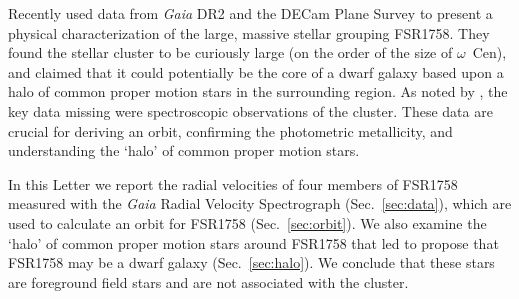 \documentclass[fleqn,usenatbib,letters]{mnras}
\begin{document}
Recently \citet[][hereafter ]{Barba2018} used data from \textit{Gaia} DR2 and the DECam Plane Survey \citep[DECaPS;][]{Schlafly2018} to present a physical characterization of the large, massive stellar grouping FSR1758. They found the stellar cluster to be curiously large (on the order of the size of $\omega$~Cen), and claimed that it could potentially be the core of a dwarf galaxy based upon a halo of common proper motion stars in the surrounding region. As noted by , the key data missing were spectroscopic observations of the cluster. These data are crucial for deriving an orbit, confirming the photometric metallicity, and understanding the `halo' of common proper motion stars.

In this Letter we report the radial velocities of four members of FSR1758 measured with the \textit{Gaia} Radial Velocity Spectrograph \citep[RVS;][]{Cropper2018,GaiaCollaboration:2018fx} (Sec.\ \ref{sec:data}), which are used to calculate an orbit for FSR1758 (Sec.\ \ref{sec:orbit}). We also examine the `halo' of common proper motion stars around FSR1758 that led  to propose that FSR1758 may be a dwarf galaxy (Sec.\  \ref{sec:halo}). We conclude that these stars are foreground field stars and are not associated with the cluster.
\end{document}
